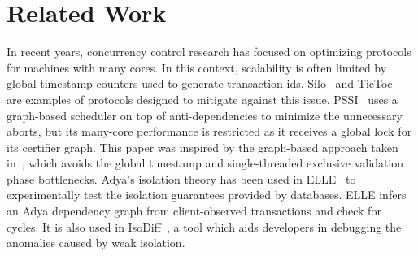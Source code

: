 \section{Related Work}
\label{sec:rel-work}

In recent years, concurrency control research has focused on optimizing protocols for machines with many cores.
In this context, scalability is often limited by global timestamp counters used to generate transaction ids.
Silo~\cite{DBLP:conf/sosp/TuZKLM13} and TicToc~\cite{DBLP:conf/sigmod/YuPSD16} are examples of protocols designed to mitigate against this issue. 
PSSI~\cite{DBLP:conf/icde/RevilakOO11} uses a graph-based scheduler on top of anti-dependencies to 
minimize the unnecessary aborts, but its many-core performance is restricted as it receives a global lock for its certifier graph.
This paper was inspired by the graph-based
approach taken in~\cite{DBLP:conf/icde/Durner019}, which avoids the global timestamp and single-threaded exclusive validation 
phase bottlenecks.
Adya's isolation theory has been used in ELLE~\cite{DBLP:journals/pvldb/AlvaroK20} to experimentally test the isolation guarantees provided by databases. ELLE infers an Adya dependency graph from client-observed  transactions and check for cycles. It is also used in IsoDiff~\cite{DBLP:journals/pvldb/GanRRB020}, a tool which aids 
developers in debugging the anomalies caused by weak isolation.

